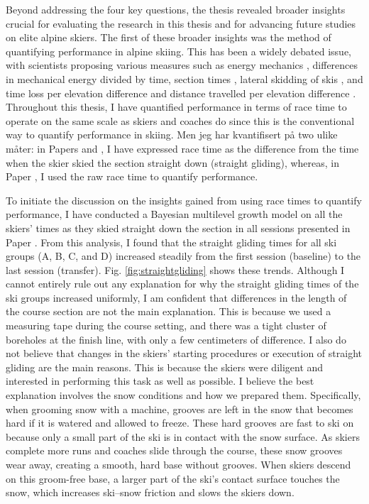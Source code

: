 Beyond addressing the four key questions, the thesis revealed broader insights crucial for evaluating the research in this thesis and for advancing future studies on elite alpine skiers. The first of these broader insights was the method of quantifying performance in alpine skiing. This has been a widely debated issue, with scientists proposing various measures such as energy mechanics \parencite{supej_differential_2008, supej_how_2010, supej_mechanical_2011} , differences in mechanical energy divided by time, section times \parencite{supej_relations_2006}, lateral skidding of skis \parencite{kirby_development_2009}, and time loss per elevation difference and distance travelled per elevation difference \parencite{federolf_quantifying_2012}. Throughout this thesis, I have quantified performance in terms of race time to operate on the same scale as skiers and coaches do since this is the conventional way to quantify performance in skiing. Men jeg har kvantifisert på two ulike måter: in Papers  and , I have expressed race time as the difference from the time when the skier skied the section straight down (straight gliding), whereas, in Paper , I used the raw race time to quantify performance.

To initiate the discussion on the insights gained from using race times to quantify performance, I have conducted a Bayesian multilevel growth model on all the skiers' times as they skied straight down the section in all sessions presented in Paper  . From this analysis, I found that the straight gliding times for all ski groups (A, B, C, and D) increased steadily from the first session (baseline) to the last session (transfer). Fig. \ref{fig:straightgliding} shows these trends. Although I cannot entirely rule out any explanation for why the straight gliding times of the ski groups increased uniformly, I am confident that differences in the length of the course section are not the main explanation. This is because we used a measuring tape during the course setting, and there was a tight cluster of boreholes at the finish line, with only a few centimeters of difference. I also do not believe that changes in the skiers' starting procedures or execution of straight gliding are the main reasons. This is because the skiers were diligent and interested in performing this task as well as possible. I believe the best explanation involves the snow conditions and how we prepared them. Specifically, when grooming snow with a machine, grooves are left in the snow that becomes hard if it is watered and allowed to freeze. These hard grooves are fast to ski on because only a small part of the ski is in contact with the snow surface. As skiers complete more runs and coaches slide through the course, these snow grooves wear away, creating a smooth, hard base without grooves. When skiers descend on this groom-free base, a larger part of the ski’s contact surface touches the snow, which increases ski–snow friction and slows the skiers down.


